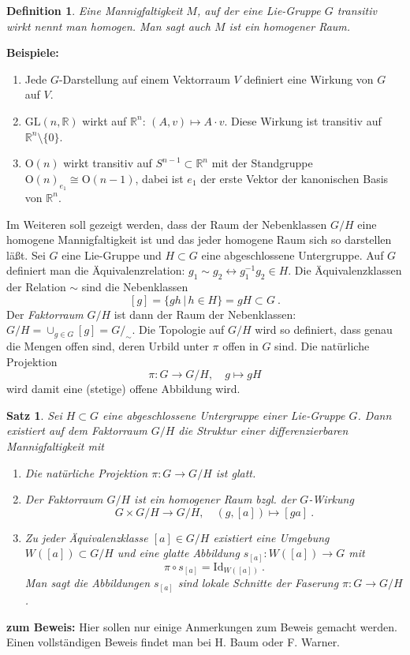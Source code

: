 \documentclass[12pt,a4paper]{article}
\def\R{\mathbb{R}}
\def\O{\mathrm{O}}
\def\GL{\mathrm{GL}}
\def\Id{\mathrm{Id}}
\newtheorem{Satz}[Lemma]{Satz}
\newtheorem{Definition}[Lemma]{Definition}
\begin{document}
\bigskip

\begin{Definition}
Eine Mannigfaltigkeit $M$, auf der eine Lie-Gruppe $G$ transitiv wirkt nennt man {\em homogen}. Man sagt auch
$M$ ist ein homogener Raum.
\end{Definition}

\bigskip

{\bf Beispiele:}
\begin{enumerate}
\item
Jede $G$-Darstellung auf einem Vektorraum $V$ definiert eine Wirkung von $G$ auf $V$.
\item
$\GL(n,\R)$ wirkt auf $\R^n$: $(A,v)\mapsto A\cdot v$. Diese Wirkung ist transitiv auf
$\R^n \setminus \{0\}$.
\item
$\O(n)$ wirkt transitiv auf $S^{n-1} \subset \R^n$ mit der Standgruppe $\O(n)_{e_1}\cong \O(n-1)$,
dabei ist $e_1$ der erste Vektor der kanonischen Basis von $\R^n$.
\end{enumerate}


\bigskip

Im Weiteren soll gezeigt werden, dass der Raum der Nebenklassen $G/H$ eine homogene Mannigfaltigkeit ist
und das jeder homogene Raum sich so darstellen l\"a\ss t. Sei $G$ eine Lie-Gruppe und $H\subset G$
eine abgeschlossene Untergruppe. Auf $G$ definiert man die \"Aquivalenzrelation: $g_1 \sim g_2
\leftrightarrow g_1^{-1} g_2\in H$. Die \"Aquivalenzklassen der Relation $\sim$ sind  die Nebenklassen
$$
[g] = \{ gh \,|\, h \in H \} = gH \subset G \ .
$$
Der {\it Faktorraum} $G/H$ ist dann der Raum der Nebenklassen: $G/H = \cup_{g\in G}[g] = G/_\sim$. Die
Topologie auf $G/H$ wird so definiert, dass genau die Mengen offen sind, deren Urbild unter $\pi$
offen in $G$ sind. Die nat\"urliche Projektion
$$
\pi : G \rightarrow G/H,\quad g \mapsto gH
$$
wird damit eine (stetige) offene Abbildung wird.

\begin{Satz}\label{faktor}
Sei $H \subset G$ eine abgeschlossene Untergruppe einer Lie-Gruppe $G$. Dann existiert auf dem
Faktorraum $G/H$ die Struktur einer differenzierbaren Mannigfaltigkeit mit
\begin{enumerate}
\item
Die nat\"urliche Projektion $\pi: G \rightarrow G/H$ ist glatt.
\item
Der Faktorraum $G/H$ ist ein homogener Raum bzgl. der $G$-Wirkung
$$
G \times G/H \rightarrow G/H, \quad (g, [a]) \mapsto [ga] \ .
$$
\item
Zu jeder \"Aquivalenzklasse $[a] \in G/H$ existiert eine Umgebung $W([a])\subset G/H$ und eine
glatte Abbildung $s_{[a]}: W([a])\rightarrow G$ mit
$$
\pi \circ s_{[a]} = \Id_{W([a])} \ .
$$
Man sagt die Abbildungen $s_{[a]}$  sind lokale Schnitte der Faserung $\pi: G\rightarrow G/H$.
\end{enumerate}
\end{Satz}
{\bf zum Beweis:} Hier sollen nur einige Anmerkungen zum Beweis gemacht werden. Einen
vollst\"andigen Beweis findet man bei H. Baum oder F. Warner.
\end{document}
